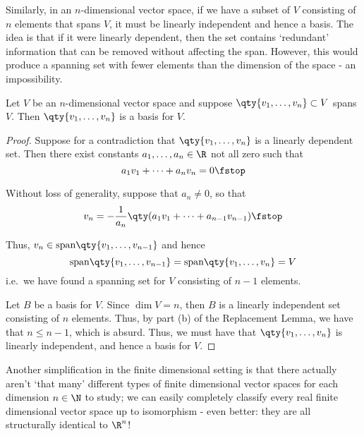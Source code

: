 Similarly, in an \( n \)-dimensional vector space, if we have a subset of \( V \) consisting of \( n \) elements that spans \( V \), it must be linearly independent and hence a basis. The idea is that if it were linearly dependent, then the set contains `redundant' information that can be removed without affecting the span. However, this would produce a spanning set with fewer elements than the dimension of the space - an impossibility.

\begin{corollary}
  \label{thm:span-basis}
  Let \( V \) be an \( n \)-dimensional vector space and suppose \( \qty{v_1,\dots,v_n}\subset V \) spans \( V \). Then \( \qty{v_1,\dots,v_n} \) is a basis for \( V \).
\end{corollary}
\begin{proof}
  Suppose for a contradiction that \( \qty{v_1,\dots,v_n} \) is a linearly dependent set. Then there exist constants \( a_1,\dots,a_n\in\R \) not all zero such that
  \[ a_1v_1+\dots+a_nv_n=0\fstop \]

  Without loss of generality, suppose that \( a_n\neq 0 \), so that
  \[ v_n=-\frac{1}{a_n}\qty(a_1v_1+\dots+a_{n-1}v_{n-1})\fstop \]

  Thus, \( v_n\in\text{span}\qty{v_1,\dots,v_{n-1}} \) and hence
  \[ \text{span}\qty{v_1,\dots,v_{n-1}}=\text{span}\qty{v_1,\dots,v_n}=V\]
  i.e.\ we have found a spanning set for \( V \) consisting of \( n-1 \) elements.

  Let \( B \) be a basis for \( V \). Since \( \dim V=n \), then \( B \) is a linearly independent set consisting of \( n \) elements. Thus, by part (b) of the Replacement Lemma, we have that \( n\leq n-1 \), which is absurd. Thus, we must have that \( \qty{v_1,\dots,v_n} \) is linearly independent, and hence a basis for \( V \).
\end{proof}

Another simplification in the finite dimensional setting is that there actually aren't `that many' different types of finite dimensional vector spaces for each dimension \( n\in\N \) to study; we can easily completely classify every real finite dimensional vector space up to isomorphism - even better: they are all structurally identical to \( \R^n \)!

